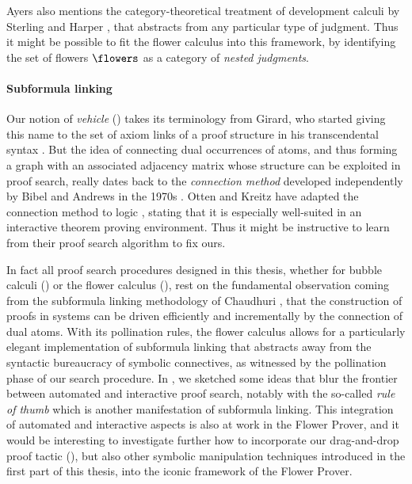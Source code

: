 Ayers also mentions the category-theoretical treatment of development calculi by
Sterling and Harper , that abstracts from any
particular type of judgment. Thus it might be possible to fit the flower
calculus into this framework, by identifying the set of flowers $\flowers$ as a
category of \emph{nested judgments}.

\paragraph{Subformula linking}

Our notion of \emph{vehicle} () takes its terminology from
Girard, who started giving this name to the set of axiom links of a proof
structure in his transcendental syntax . But the idea of connecting dual
occurrences of atoms, and thus forming a graph with an associated adjacency
matrix whose structure can be exploited in proof search, really dates back to
the \emph{connection method} developed independently by Bibel and Andrews in the
1970s . Otten and Kreitz have adapted the connection method
to  logic , stating that it is
especially well-suited in an interactive theorem proving environment. Thus it
might be instructive to learn from their proof search algorithm to fix ours.

In fact all proof search procedures designed in this thesis, whether for bubble
calculi () or the flower calculus
(), rest on the fundamental observation coming from the
subformula linking methodology of Chaudhuri , that the
construction of proofs in  systems can be driven efficiently and
incrementally by the connection of dual atoms. With its pollination rules, the
flower calculus allows for a particularly elegant implementation of subformula
linking that abstracts away from the syntactic bureaucracy of symbolic
connectives, as witnessed by the pollination phase of our search procedure. In
, we sketched some ideas that blur the frontier
between automated and interactive proof search, notably with the so-called
\emph{rule of thumb} which is another manifestation of subformula linking. This
integration of automated and interactive aspects is also at work in the Flower
Prover, and it would be interesting to investigate further how to incorporate
our drag-and-drop proof tactic (), but also other symbolic
manipulation techniques introduced in the first part of this thesis, into the
iconic framework of the Flower Prover.


